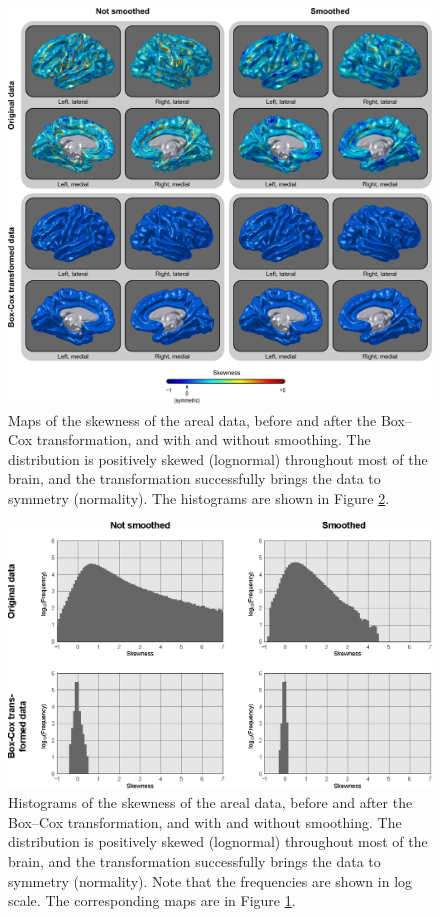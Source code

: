\begin{figure}[!p]  %
\centering
\includegraphics[width=14cm]{images/skewness.png}
\caption[Maps of the skewness of the areal data.]{Maps of the skewness of the areal data, before and after the Box--Cox transformation, and with and without smoothing. The distribution is positively skewed (lognormal) throughout most of the brain, and the transformation successfully brings the data to symmetry (normality). The histograms are shown in Figure \ref{fig:areal:skewness-hist}.}
\label{fig:areal:skewness}
\end{figure}

\begin{figure}[!p]  %
\centering
\includegraphics[width=14cm]{images/skewness-hist.eps}
\caption[Histograms of the skewness of the areal data.]{Histograms of the skewness of the areal data, before and after the Box--Cox transformation, and with and without smoothing. The distribution is positively skewed (lognormal) throughout most of the brain, and the transformation successfully brings the data to symmetry (normality). Note that the frequencies are shown in log scale. The corresponding maps are in Figure \ref{fig:areal:skewness}.}
\label{fig:areal:skewness-hist}
\end{figure}

